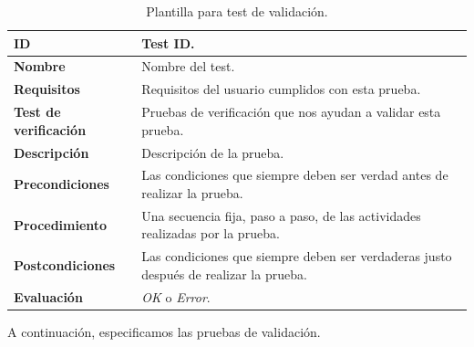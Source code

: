 \begin{center}
\begin{table}[htb]
\centering
\caption{Plantilla para test de validación.}
\begin{tabular}{@{}p{2.5cm} p{9cm}@{}} 
\toprule
\textbf{ID} 					& Test ID. \\
\midrule
\textbf{Nombre} 				& Nombre del test. \\
\midrule
\textbf{Requisitos} 		& Requisitos del usuario cumplidos con esta prueba. \\
\midrule
\textbf{Test de verificación} 	& Pruebas de verificación que nos ayudan a validar esta prueba. \\
\midrule
\textbf{Descripción} 		& Descripción de la prueba. \\
\midrule
\textbf{Precondiciones}		& Las condiciones que siempre deben ser verdad antes de realizar la prueba. \\
\midrule
\textbf{Procedimiento}			& Una secuencia fija, paso a paso, de las actividades realizadas por la prueba. \\
\midrule
\textbf{Postcondiciones} 		& Las condiciones que siempre deben ser verdaderas justo después de realizar la prueba. \\
\midrule
\textbf{Evaluación} 			& \textit{OK} o \textit{Error}. \\
\bottomrule
\end{tabular}
\label{tab:validation_tests}
\end{table}
\end{center}


A continuación, especificamos las pruebas de validación.

